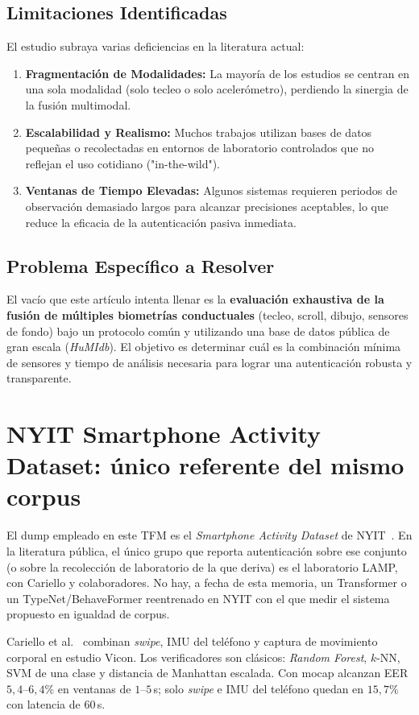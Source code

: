 \subsection*{Limitaciones Identificadas}
El estudio subraya varias deficiencias en la literatura actual:
\begin{enumerate}
    \item \textbf{Fragmentación de Modalidades:} La mayoría de los estudios se centran en una sola modalidad (solo tecleo o solo acelerómetro), perdiendo la sinergia de la fusión multimodal.
    \item \textbf{Escalabilidad y Realismo:} Muchos trabajos utilizan bases de datos pequeñas o recolectadas en entornos de laboratorio controlados que no reflejan el uso cotidiano ("in-the-wild").
    \item \textbf{Ventanas de Tiempo Elevadas:} Algunos sistemas requieren periodos de observación demasiado largos para alcanzar precisiones aceptables, lo que reduce la eficacia de la autenticación pasiva inmediata.
\end{enumerate}

\subsection*{Problema Específico a Resolver}
El vacío que este artículo intenta llenar es la \textbf{evaluación exhaustiva de la fusión de múltiples biometrías conductuales} (tecleo, scroll, dibujo, sensores de fondo) bajo un protocolo común y utilizando una base de datos pública de gran escala (\textit{HuMIdb}). El objetivo es determinar cuál es la combinación mínima de sensores y tiempo de análisis necesaria para lograr una autenticación robusta y transparente.

\section{NYIT Smartphone Activity Dataset: único referente del mismo corpus}

El dump empleado en este TFM es el \textit{Smartphone Activity Dataset} de NYIT~\cite{NYIT_dataset:2025}.
En la literatura pública, el único grupo que reporta autenticación sobre ese conjunto (o sobre la recolección
de laboratorio de la que deriva) es el laboratorio LAMP, con Cariello y colaboradores. No hay, a fecha de
esta memoria, un Transformer o un TypeNet/BehaveFormer reentrenado en NYIT con el que medir el sistema propuesto
en igualdad de corpus.

Cariello et al.~\cite{cariello2025posture} combinan \textit{swipe}, IMU del teléfono y captura de movimiento
corporal en estudio Vicon. Los verificadores son clásicos: \textit{Random Forest}, $k$-NN, SVM de una clase y
distancia de Manhattan escalada. Con mocap alcanzan EER $5{,}4$--$6{,}4\%$ en ventanas de $1$--$5$\,s;
solo \textit{swipe} e IMU del teléfono quedan en $15{,}7\%$ con latencia de $60$\,s.

